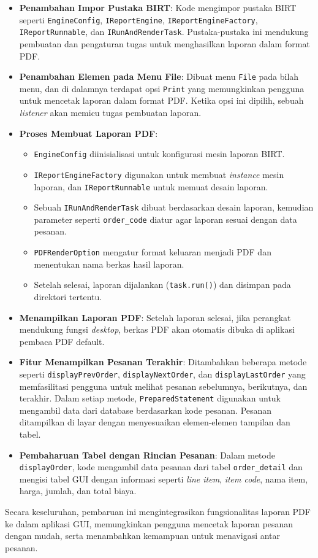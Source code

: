\begin{itemize}
	\item \textbf{Penambahan Impor Pustaka BIRT}:
	Kode mengimpor pustaka BIRT seperti \texttt{EngineConfig}, \texttt{IReportEngine}, \texttt{IReportEngineFactory}, \texttt{IReportRunnable}, dan \texttt{IRunAndRenderTask}. Pustaka-pustaka ini mendukung pembuatan dan pengaturan tugas untuk menghasilkan laporan dalam format PDF.
	
	\item \textbf{Penambahan Elemen pada Menu File}:
	Dibuat menu \texttt{File} pada bilah menu, dan di dalamnya terdapat opsi \texttt{Print} yang memungkinkan pengguna untuk mencetak laporan dalam format PDF. Ketika opsi ini dipilih, sebuah \textit{listener} akan memicu tugas pembuatan laporan.
	
	\item \textbf{Proses Membuat Laporan PDF}:
	\begin{itemize}
		\item \texttt{EngineConfig} diinisialisasi untuk konfigurasi mesin laporan BIRT.
		\item \texttt{IReportEngineFactory} digunakan untuk membuat \textit{instance} mesin laporan, dan \texttt{IReportRunnable} untuk memuat desain laporan.
		\item Sebuah \texttt{IRunAndRenderTask} dibuat berdasarkan desain laporan, kemudian parameter seperti \texttt{order\_code} diatur agar laporan sesuai dengan data pesanan.
		\item \texttt{PDFRenderOption} mengatur format keluaran menjadi PDF dan menentukan nama berkas hasil laporan.
		\item Setelah selesai, laporan dijalankan (\texttt{task.run()}) dan disimpan pada direktori tertentu.
	\end{itemize}
	
	\item \textbf{Menampilkan Laporan PDF}:
	Setelah laporan selesai, jika perangkat mendukung fungsi \textit{desktop}, berkas PDF akan otomatis dibuka di aplikasi pembaca PDF default.
	
	\item \textbf{Fitur Menampilkan Pesanan Terakhir}:
	Ditambahkan beberapa metode seperti \texttt{displayPrevOrder}, \texttt{displayNextOrder}, dan \texttt{displayLastOrder} yang memfasilitasi pengguna untuk melihat pesanan sebelumnya, berikutnya, dan terakhir.
	Dalam setiap metode, \texttt{PreparedStatement} digunakan untuk mengambil data dari database berdasarkan kode pesanan. Pesanan ditampilkan di layar dengan menyesuaikan elemen-elemen tampilan dan tabel.
	
	\item \textbf{Pembaharuan Tabel dengan Rincian Pesanan}:
	Dalam metode \texttt{displayOrder}, kode mengambil data pesanan dari tabel \texttt{order\_detail} dan mengisi tabel GUI dengan informasi seperti \textit{line item}, \textit{item code}, nama item, harga, jumlah, dan total biaya.
\end{itemize}

Secara keseluruhan, pembaruan ini mengintegrasikan fungsionalitas laporan PDF ke dalam aplikasi GUI, memungkinkan pengguna mencetak laporan pesanan dengan mudah, serta menambahkan kemampuan untuk menavigasi antar pesanan.



